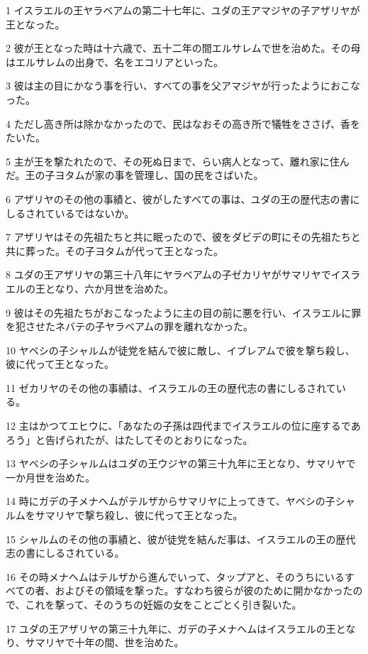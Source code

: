 \par 1 イスラエルの王ヤラベアムの第二十七年に、ユダの王アマジヤの子アザリヤが王となった。
\par 2 彼が王となった時は十六歳で、五十二年の間エルサレムで世を治めた。その母はエルサレムの出身で、名をエコリアといった。
\par 3 彼は主の目にかなう事を行い、すべての事を父アマジヤが行ったようにおこなった。
\par 4 ただし高き所は除かなかったので、民はなおその高き所で犠牲をささげ、香をたいた。
\par 5 主が王を撃たれたので、その死ぬ日まで、らい病人となって、離れ家に住んだ。王の子ヨタムが家の事を管理し、国の民をさばいた。
\par 6 アザリヤのその他の事績と、彼がしたすべての事は、ユダの王の歴代志の書にしるされているではないか。
\par 7 アザリヤはその先祖たちと共に眠ったので、彼をダビデの町にその先祖たちと共に葬った。その子ヨタムが代って王となった。
\par 8 ユダの王アザリヤの第三十八年にヤラベアムの子ゼカリヤがサマリヤでイスラエルの王となり、六か月世を治めた。
\par 9 彼はその先祖たちがおこなったように主の目の前に悪を行い、イスラエルに罪を犯させたネバテの子ヤラベアムの罪を離れなかった。
\par 10 ヤベシの子シャルムが徒党を結んで彼に敵し、イブレアムで彼を撃ち殺し、彼に代って王となった。
\par 11 ゼカリヤのその他の事績は、イスラエルの王の歴代志の書にしるされている。
\par 12 主はかつてエヒウに、「あなたの子孫は四代までイスラエルの位に座するであろう」と告げられたが、はたしてそのとおりになった。
\par 13 ヤベシの子シャルムはユダの王ウジヤの第三十九年に王となり、サマリヤで一か月世を治めた。
\par 14 時にガデの子メナヘムがテルザからサマリヤに上ってきて、ヤベシの子シャルムをサマリヤで撃ち殺し、彼に代って王となった。
\par 15 シャルムのその他の事績と、彼が徒党を結んだ事は、イスラエルの王の歴代志の書にしるされている。
\par 16 その時メナヘムはテルザから進んでいって、タップアと、そのうちにいるすべての者、およびその領域を撃った。すなわち彼らが彼のために開かなかったので、これを撃って、そのうちの妊娠の女をことごとく引き裂いた。
\par 17 ユダの王アザリヤの第三十九年に、ガデの子メナヘムはイスラエルの王となり、サマリヤで十年の間、世を治めた。
